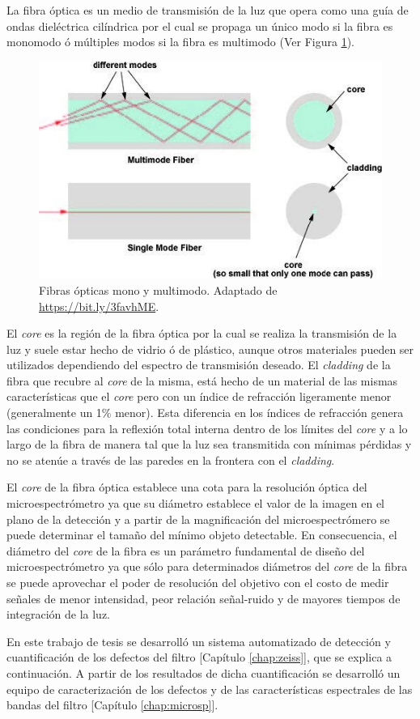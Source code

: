 La fibra óptica es un medio de transmisión de la luz que opera como una guía de ondas dieléctrica cilíndrica por el cual se propaga un único modo si la fibra es monomodo ó múltiples modos si la fibra es multimodo (Ver Figura \ref{fig:guiasmon}). 
\begin{figure}[H]
	\centering
	\includegraphics[scale=1.0]{Figs/introduccion/guias.jpg}
	\caption{Fibras ópticas mono y multimodo. Adaptado de \href{https://bit.ly/3favhME}{https://bit.ly/3favhME}.}
	\label{fig:guiasmon}
\end{figure}
El \textit{core} es la región de la fibra óptica por la cual se realiza la transmisión de la luz y suele estar hecho de vidrio ó de plástico, aunque otros materiales pueden ser utilizados dependiendo del espectro de transmisión deseado. El \textit{cladding} de la fibra que recubre al \textit{core} de la misma, está hecho de un material de las mismas características que el \textit{core} pero con un índice de refracción ligeramente menor (generalmente un 1\% menor)\cite{hecht2012optics}. Esta diferencia en los índices de refracción genera las condiciones para la reflexión total interna dentro de los límites del \textit{core} y a lo largo de la fibra de manera tal que la luz sea transmitida con mínimas pérdidas y no se atenúe a través de las paredes en la frontera con el \textit{cladding}. 

El \textit{core} de la fibra óptica establece una cota para la resolución óptica del microespectrómetro ya que su diámetro establece el valor de la imagen en el plano de la detección y a partir de la magnificación del microespectrómero se puede determinar el tamaño del mínimo objeto detectable. En consecuencia, el diámetro del \textit{core} de la fibra es un parámetro fundamental de diseño del microespectrómetro ya que sólo para determinados diámetros del \textit{core} de la fibra se puede aprovechar el poder de resolución del objetivo con el costo de medir señales de menor intensidad, peor relación señal-ruido y de mayores tiempos de integración de la luz.

En este trabajo de tesis se desarrolló un sistema automatizado de detección y cuantificación de los defectos del filtro [Capítulo \ref{chap:zeiss}], que se explica a continuación. A partir de los resultados de dicha cuantificación se desarrolló un equipo de caracterización de los defectos y de las características espectrales de las bandas del filtro [Capítulo \ref{chap:microsp}].
